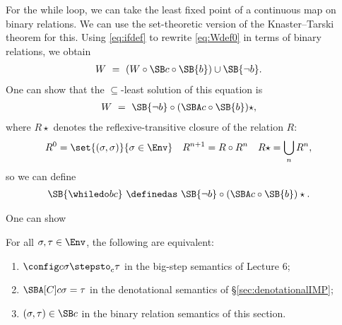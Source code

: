 For the while loop, we can take the least fixed point of a continuous map on binary relations. We can use the set-theoretic version of the Knaster--Tarski theorem for this. Using \eqref{eq:ifdef} to rewrite \eqref{eq:Wdef0} in terms of binary relations, we obtain
\begin{align*}
W\ &=\ (W\circ\SB c\circ\SB{b}) \cup \SB{\neg b}.
\end{align*}
One can show that the $\subseteq$-least solution of this equation is
\begin{align*}
W\ &=\ \SB{\neg b}\circ(\SBA c\circ\SB{b})\star,
\end{align*}
where $R\star$ denotes the reflexive-transitive closure of the relation $R$:
\begin{align*}
R^0 &= \set{(\sigma,\sigma)}{\sigma\in\Env} &
R^{n+1} &= R\circ R^n &
R\star &= \bigcup_n R^n,
\end{align*}
so we can define
\begin{align*}
\SB{\whiledo bc}\ &\definedas\ \SB{\neg b}\circ(\SBA c\circ\SB{b})\star.
\end{align*}

One can show

\begin{theorem}
For all $\sigma,\tau\in\Env$, the following are equivalent:
\begin{enumerate}
\def\labelenumi{{\upshape(\roman{enumi})}}
\item
$\config c\sigma\stepsto_{\mathrm{c}}\tau$ in the big-step semantics of Lecture 6;
\item
$\SBA[C]c\sigma = \tau$ in the denotational semantics of \S\ref{sec:denotationalIMP};
\item
$(\sigma,\tau)\in\SB c$ in the binary relation semantics of this section.
\end{enumerate}
\end{theorem}
